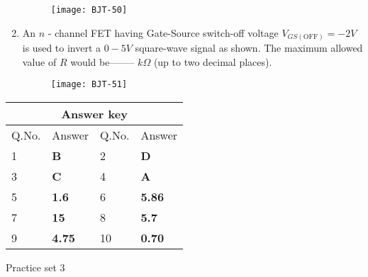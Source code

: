 \begin{enumerate}
	{	}
	\begin{figure}[H]
		\centering
		\texttt{[image: BJT-50]}
	\end{figure}
\item An $n$ - channel FET having Gate-Source switch-off voltage $V_{G S(\mathrm{OFF})}=-2 V$ is used to invert a $0-5 V$ square-wave signal as shown. The maximum allowed value of $R$ would be-------- $k \Omega$ (up to two decimal places).
{}
\begin{figure}[H]
	\centering
	\texttt{[image: BJT-51]}
\end{figure}
\end{enumerate}
\setlength\arrayrulewidth{1pt}
\begin{table}[H]
	\centering
	\begin{tabular}{|p{1.5cm}|p{1.5cm}||p{1.5cm}|p{1.5cm}|}
		\hline
		\multicolumn{4}{|c|}{\textbf{Answer key}}\\\hline\hline
		\rowcolor{ocrel}Q.No.&Answer&Q.No.&Answer\\\hline
		1&\textbf{B} &2&\textbf{D}\\\hline 
		3&\textbf{C} &4&\textbf{A} \\\hline
		5&\textbf{1.6} &6&\textbf{5.86} \\\hline
		7&\textbf{15}&8&\textbf{5.7}\\\hline
		9&\textbf{4.75}&10&\textbf{0.70}\\\hline
	\end{tabular}
\end{table}
\newpage
\begin{abox}
	Practice set 3
	\end{abox}
